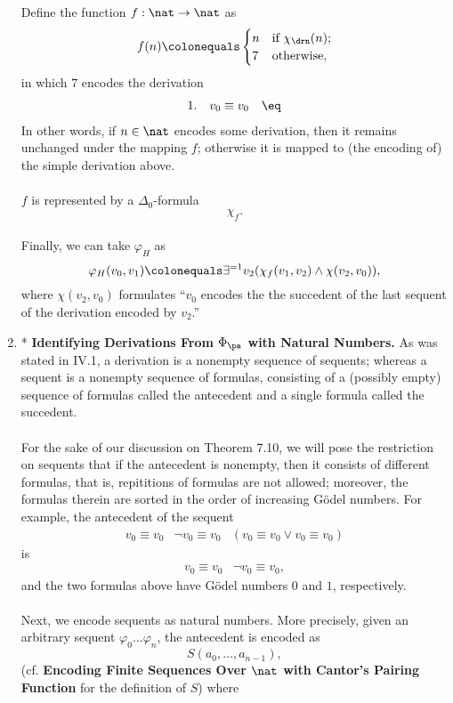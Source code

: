 \begin{enumerate}[1.]
Define the function $f : \nat \to \nat$ as
\[
f(n) \colonequals \begin{cases}
n & \mbox{if \(\chi_\drn (n)\)}; \cr
7 & \mbox{otherwise},
\end{cases}
\]
in which $7$ encodes the derivation
\[
\begin{array}{lll}
1. & v_0 \equiv v_0 & \mbox{$\eq$}
\end{array}
\]
In other words, if $n \in \nat$ encodes some derivation, then it remains unchanged under the mapping $f$; otherwise it is mapped to (the encoding of) the simple derivation above.\\
\ \\
$f$ is represented by a $\Delta_0$-formula
\[
\chi_f.
\]
\ \\
Finally, we can take $\varphi_H$ as
\[
\varphi_H (v_0, v_1) \colonequals \exists^{=1} v_2 (\chi_f (v_1, v_2) \land \chi (v_2, v_0) ),
\]
where $\chi (v_2, v_0)$ formulates ``$v_0$ encodes the the succedent of the last sequent of the derivation encoded by $v_2$.''
%
\item* \textbf{Identifying Derivations From $\Phi_\pa$ with Natural Numbers.} As was stated in IV.1, a derivation is a nonempty sequence of sequents; whereas a sequent is a nonempty sequence of formulas, consisting of a (possibly empty) sequence of formulas called the antecedent and a single formula called the succedent.\\
\ \\
For the sake of our discussion on Theorem 7.10, we will pose the restriction on sequents that if the antecedent is nonempty, then it consists of different formulas, that is, repititions of formulas are not allowed; moreover, the formulas therein are sorted in the order of increasing G\"{o}del numbers. For example, the antecedent of the sequent
\[
\begin{array}{lll}
v_0 \equiv v_0 & \neg v_0 \equiv v_0 & (v_0 \equiv v_0 \lor v_0 \equiv v_0)
\end{array}
\]
is
\[
\begin{array}{ll}
v_0 \equiv v_0 & \neg v_0 \equiv v_0,
\end{array}
\]
and the two formulas above have G\"{o}del numbers $0$ and $1$, respectively.\\
\ \\
Next, we encode sequents as natural numbers. More precisely, given an arbitrary sequent $\varphi_0 \ldots \varphi_n$, the antecedent is encoded as
\[
S(a_0, \ldots, a_{n - 1}),
\]
(cf. \textbf{Encoding Finite Sequences Over $\nat$ with Cantor's Pairing Function} for the definition of $S$) where

\end{enumerate}
